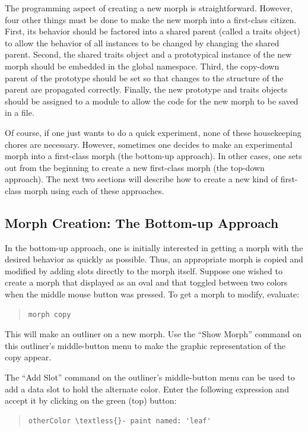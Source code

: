 \documentclass[letterpaper,10pt,english]{sphinxmanual}
\begin{document}
The programming aspect of creating a new morph is straightforward. However, four other things must be done to make the new morph into a first-class citizen. First, its behavior should be factored into a shared parent (called a traits object) to allow the behavior of all instances to be changed by changing the shared parent. Second, the shared traits object and a prototypical instance of the new morph should be embedded in the global namespace. Third, the copy-down parent of the prototype should be set so that changes to the structure of the parent are propagated correctly. Finally, the new prototype and traits objects should be assigned to a module to allow the code for the new morph to be saved in a file.

Of course, if one just wants to do a quick experiment, none of these housekeeping chores are necessary. However, sometimes one decides to make an experimental morph into a first-class morph (the bottom-up approach). In other cases, one sets out from the beginning to create a new first-class morph (the top-down approach). The next two sections will describe how to create a new kind of first-class morph using each of these approaches.


\subsection{Morph Creation: The Bottom-up Approach}
\label{morphic:morph-creation-the-bottom-up-approach}
In the bottom-up approach, one is initially interested in getting a morph with the desired behavior as quickly as possible. Thus, an appropriate morph is copied and modified by adding slots directly to the morph itself. Suppose one wished to create a morph that displayed as an oval and that toggled between two colors when the middle mouse button was pressed. To get a morph to modify, evaluate:
\begin{quote}

\begin{Verbatim}[commandchars=\\\{\}]
morph copy
\end{Verbatim}
\end{quote}

This will make an outliner on a new morph. Use the ``Show Morph'' command on this outliner's middle-button menu to make the graphic representation of the copy appear.

The ``Add Slot'' command on the outliner's middle-button menu can be used to add a data slot to hold the alternate color. Enter the following expression and accept it by clicking on the green (top) button:
\begin{quote}

\begin{Verbatim}[commandchars=\\\{\}]
otherColor \textless{}- paint named: 'leaf'
\end{Verbatim}
\end{quote}
\end{document}
